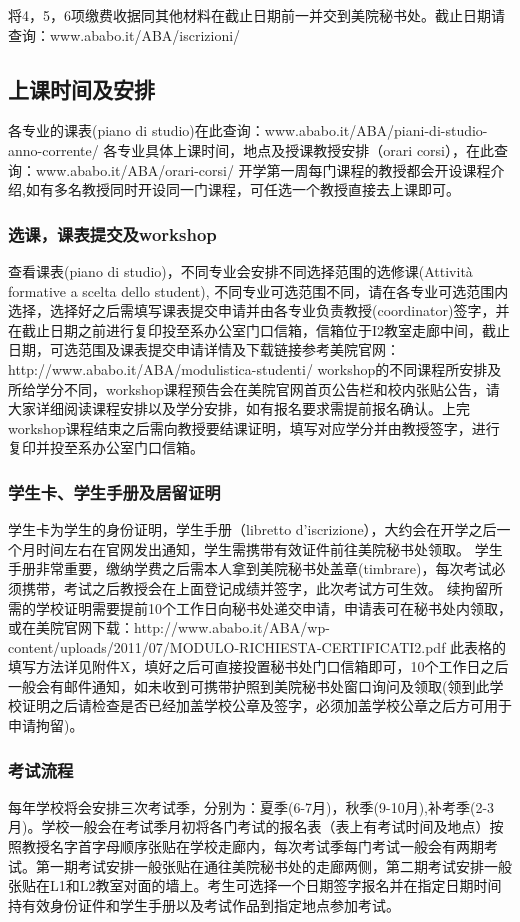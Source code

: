  将4，5，6项缴费收据同其他材料在截止日期前一并交到美院秘书处。截止日期请查询：www.ababo.it/ABA/iscrizioni/


\subsection{上课时间及安排}
各专业的课表(piano di studio)在此查询：www.ababo.it/ABA/piani-di-studio-anno-corrente/ 
各专业具体上课时间，地点及授课教授安排（orari corsi），在此查询：www.ababo.it/ABA/orari-corsi/
开学第一周每门课程的教授都会开设课程介绍,如有多名教授同时开设同一门课程，可任选一个教授直接去上课即可。


\subsubsection{选课，课表提交及workshop}
查看课表(piano di studio)，不同专业会安排不同选择范围的选修课(Attività formative a scelta dello student), 不同专业可选范围不同，请在各专业可选范围内选择，选择好之后需填写课表提交申请并由各专业负责教授(coordinator)签字，并在截止日期之前进行复印投至系办公室门口信箱，信箱位于I2教室走廊中间，截止日期，可选范围及课表提交申请详情及下载链接参考美院官网：http://www.ababo.it/ABA/modulistica-studenti/
workshop的不同课程所安排及所给学分不同，workshop课程预告会在美院官网首页公告栏和校内张贴公告，请大家详细阅读课程安排以及学分安排，如有报名要求需提前报名确认。上完workshop课程结束之后需向教授要结课证明，填写对应学分并由教授签字，进行复印并投至系办公室门口信箱。


\subsubsection{学生卡、学生手册及居留证明}
学生卡为学生的身份证明，学生手册（libretto d’iscrizione），大约会在开学之后一个月时间左右在官网发出通知，学生需携带有效证件前往美院秘书处领取。
学生手册非常重要，缴纳学费之后需本人拿到美院秘书处盖章(timbrare)，每次考试必须携带，考试之后教授会在上面登记成绩并签字，此次考试方可生效。
续拘留所需的学校证明需要提前10个工作日向秘书处递交申请，申请表可在秘书处内领取，或在美院官网下载：http://www.ababo.it/ABA/wp-content/uploads/2011/07/MODULO-RICHIESTA-CERTIFICATI2.pdf
此表格的填写方法详见附件X，填好之后可直接投置秘书处门口信箱即可，10个工作日之后一般会有邮件通知，如未收到可携带护照到美院秘书处窗口询问及领取(领到此学校证明之后请检查是否已经加盖学校公章及签字，必须加盖学校公章之后方可用于申请拘留)。

\subsubsection{考试流程}
每年学校将会安排三次考试季，分别为：夏季(6-7月)，秋季(9-10月),补考季(2-3月)。学校一般会在考试季月初将各门考试的报名表（表上有考试时间及地点）按照教授名字首字母顺序张贴在学校走廊内，每次考试季每门考试一般会有两期考试。第一期考试安排一般张贴在通往美院秘书处的走廊两侧，第二期考试安排一般张贴在L1和L2教室对面的墙上。考生可选择一个日期签字报名并在指定日期时间持有效身份证件和学生手册以及考试作品到指定地点参加考试。


